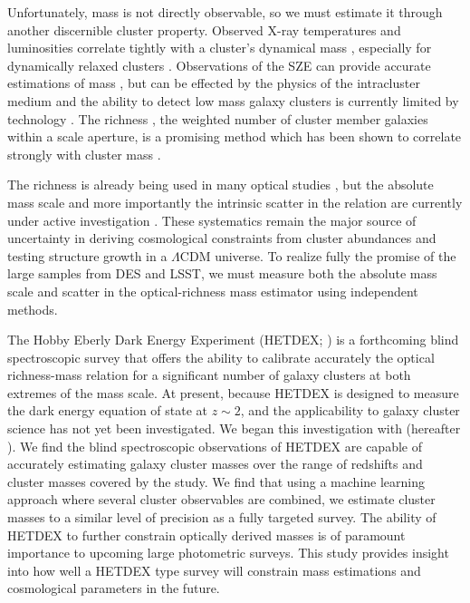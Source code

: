 Unfortunately, mass is not directly observable, so we must estimate it through another discernible cluster property. Observed X-ray temperatures and luminosities correlate tightly with a cluster's dynamical mass , especially for dynamically relaxed clusters . Observations of the SZE can provide accurate estimations of mass , but can be effected by the physics of the intracluster medium  and the ability to detect low mass galaxy clusters is currently limited by technology . The richness , the weighted number of cluster member galaxies within a scale aperture, is a promising method which has been shown to correlate strongly with cluster mass . 

The richness is already being used in many optical studies , but the absolute mass scale and more importantly the  intrinsic scatter in the relation are currently under active investigation . These systematics remain the major source of uncertainty in deriving cosmological constraints from cluster abundances and testing structure growth in a $\Lambda$CDM universe. To realize fully the promise of the large samples from DES and LSST, we must measure both the absolute mass scale and scatter in the optical-richness mass estimator using independent methods.

The Hobby Eberly Dark Energy Experiment (HETDEX; \citealt{Hill2008}) is a forthcoming blind spectroscopic survey that offers the ability to calibrate accurately the optical richness-mass relation for a significant number of galaxy clusters at both extremes of the mass scale. At present, because HETDEX is designed to measure the dark energy equation of state at $z\sim2$, and the applicability to galaxy cluster science has not yet been investigated.  We began this investigation with \cite{Boada2016} (hereafter ). We find the blind spectroscopic observations of HETDEX are capable of accurately estimating galaxy cluster masses over the range of redshifts and cluster masses covered by the study. We find that using a machine learning approach where several cluster observables are combined, we estimate cluster masses to a similar level of precision as a fully targeted survey. The ability of HETDEX to further constrain optically derived masses is of paramount importance to upcoming large photometric surveys. This study provides insight into how well a HETDEX type survey will constrain mass estimations and cosmological parameters in the future.

